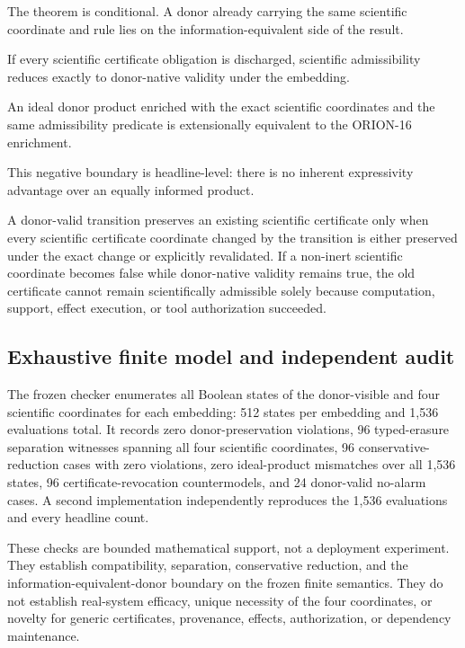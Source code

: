 The theorem is conditional. A donor already carrying the same scientific coordinate and rule lies on the information-equivalent side of the result.

\begin{theorem}
If every scientific certificate obligation is discharged, scientific admissibility reduces exactly to donor-native validity under the embedding.
\end{theorem}

\begin{theorem}
An ideal donor product enriched with the exact scientific coordinates and the same admissibility predicate is extensionally equivalent to the ORION-16 enrichment.
\end{theorem}

This negative boundary is headline-level: there is no inherent expressivity advantage over an equally informed product.

\begin{theorem}
A donor-valid transition preserves an existing scientific certificate only when every scientific certificate coordinate changed by the transition is either preserved under the exact change or explicitly revalidated. If a non-inert scientific coordinate becomes false while donor-native validity remains true, the old certificate cannot remain scientifically admissible solely because computation, support, effect execution, or tool authorization succeeded.
\end{theorem}

\subsection{Exhaustive finite model and independent audit}
The frozen checker enumerates all Boolean states of the donor-visible and four scientific coordinates for each embedding: 512 states per embedding and 1,536 evaluations total. It records zero donor-preservation violations, 96 typed-erasure separation witnesses spanning all four scientific coordinates, 96 conservative-reduction cases with zero violations, zero ideal-product mismatches over all 1,536 states, 96 certificate-revocation countermodels, and 24 donor-valid no-alarm cases. A second implementation independently reproduces the 1,536 evaluations and every headline count.

These checks are bounded mathematical support, not a deployment experiment. They establish compatibility, separation, conservative reduction, and the information-equivalent-donor boundary on the frozen finite semantics. They do not establish real-system efficacy, unique necessity of the four coordinates, or novelty for generic certificates, provenance, effects, authorization, or dependency maintenance.

